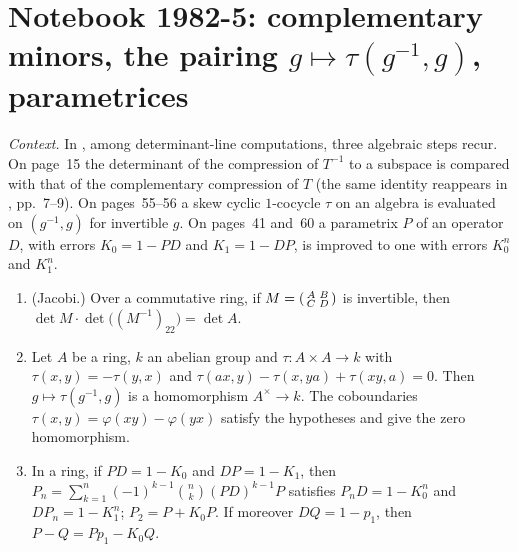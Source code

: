 \section[Notebook 1982-5: complementary minors, the $K_1$ pairing, parametrices]{Notebook 1982-5: complementary minors, the pairing $g \mapsto \tau(g^{-1}, g)$, parametrices\protect{}}\label{sec:quillen-1982-5}

\emph{Context.} In , among determinant-line computations, three algebraic steps recur. On page~15 the determinant of the compression of $T^{-1}$ to a subspace is compared with that of the complementary compression of $T$ (the same identity reappears in , pp.~7--9). On pages~55--56 a skew cyclic $1$-cocycle $\tau$ on an algebra is evaluated on $(g^{-1}, g)$ for invertible $g$. On pages~41 and~60 a parametrix $P$ of an operator $D$, with errors $K_0 = 1 - PD$ and $K_1 = 1 - DP$, is improved to one with errors $K_0^n$ and $K_1^n$.

\begin{encadre}
\begin{theoreme}\label{thm:quillen-1982-5}\leavevmode
\begin{enumerate}
\item (Jacobi.) Over a commutative ring, if $M = \begin{psmallmatrix} A & B\\ C & D\end{psmallmatrix}$ is invertible, then $\det M \cdot \det\bigl((M^{-1})_{22}\bigr) = \det A$.
\item Let $A$ be a ring, $k$ an abelian group and $\tau : A \times A \to k$ with $\tau(x, y) = -\tau(y, x)$ and $\tau(ax, y) - \tau(x, ya) + \tau(xy, a) = 0$. Then $g \mapsto \tau(g^{-1}, g)$ is a homomorphism $A^\times \to k$. The coboundaries $\tau(x, y) = \varphi(xy) - \varphi(yx)$ satisfy the hypotheses and give the zero homomorphism.
\item In a ring, if $PD = 1 - K_0$ and $DP = 1 - K_1$, then $P_n = \sum_{k=1}^n (-1)^{k-1}\binom nk (PD)^{k-1}P$ satisfies $P_nD = 1 - K_0^n$ and $DP_n = 1 - K_1^n$; $P_2 = P + K_0P$. If moreover $DQ = 1 - p_1$, then $P - Q = Pp_1 - K_0Q$.
\end{enumerate}
\end{theoreme}
\end{encadre}

